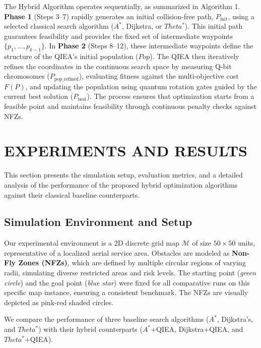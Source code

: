 \noindent The Hybrid Algorithm operates sequentially, as summarized in Algorithm 1. \textbf{Phase 1} (Steps 3--7) rapidly generates an initial collision-free path, $P_{\text{init}}$, using a selected classical search algorithm ($A^*$, Dijkstra, or $Theta^*$). This initial path guarantees feasibility and provides the fixed set of intermediate waypoints $\{p_1, \ldots, p_{k-1}\}$. In \textbf{Phase 2} (Steps 8--12), these intermediate waypoints define the structure of the QIEA's initial population ($Pop$). The QIEA then iteratively refines the coordinates in the continuous search space by measuring Q-bit chromosomes ($P_{\text{pop\_refined}}$), evaluating fitness against the multi-objective cost $F(P)$, and updating the population using quantum rotation gates guided by the current best solution ($P_{\text{best}}$). The process ensures that optimization starts from a feasible point and maintains feasibility through continuous penalty checks against NFZs.



\section{EXPERIMENTS AND RESULTS}
\label{sec:experiments}

This section presents the simulation setup, evaluation metrics, and a detailed analysis of the performance of the proposed hybrid optimization algorithms against their classical baseline counterparts.


\subsection{Simulation Environment and Setup}

Our experimental environment is a 2D discrete grid map $\mathcal{M}$ of size $50 \times 50$ units, representative of a localized aerial service area. Obstacles are modeled as \textbf{Non-Fly Zones (NFZs)}, which are defined by multiple circular regions of varying radii, simulating diverse restricted areas and risk levels. The starting point (\textit{green circle}) and the goal point (\textit{blue star}) were fixed for all comparative runs on this specific map instance, ensuring a consistent benchmark. The NFZs are visually depicted as pink-red shaded circles.

We compare the performance of three baseline search algorithms ($A^{*}$, Dijkstra's, and $Theta^{*}$) with their hybrid counterparts ($A^{*}$+QIEA, Dijkstra+QIEA, and $Theta^{*}$+QIEA).


